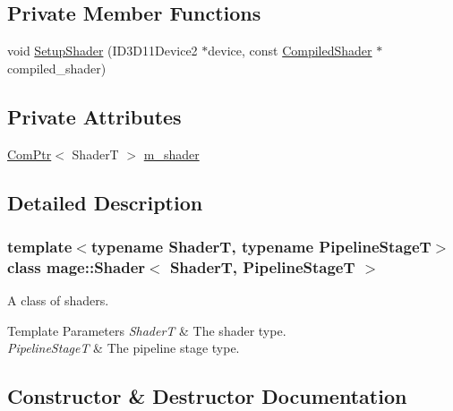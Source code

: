\subsection*{Private Member Functions}
\begin{DoxyCompactItemize}
\item 
void \hyperlink{classmage_1_1_shader_ac905389877d7722cc47b5f5177cf678f}{Setup\+Shader} (I\+D3\+D11\+Device2 $\ast$device, const \hyperlink{structmage_1_1_compiled_shader}{Compiled\+Shader} $\ast$compiled\+\_\+shader)
\end{DoxyCompactItemize}
\subsection*{Private Attributes}
\begin{DoxyCompactItemize}
\item 
\hyperlink{namespacemage_ae74f374780900893caa5555d1031fd79}{Com\+Ptr}$<$ ShaderT $>$ \hyperlink{classmage_1_1_shader_ac63260bdb25648451ddc1ee09d67c061}{m\+\_\+shader}
\end{DoxyCompactItemize}


\subsection{Detailed Description}
\subsubsection*{template$<$typename ShaderT, typename Pipeline\+StageT$>$\newline
class mage\+::\+Shader$<$ Shader\+T, Pipeline\+Stage\+T $>$}

A class of shaders.


\begin{DoxyTemplParams}{Template Parameters}
{\em ShaderT} & The shader type. \\
\hline
{\em Pipeline\+StageT} & The pipeline stage type. \\
\hline
\end{DoxyTemplParams}


\subsection{Constructor \& Destructor Documentation}
\hypertarget{classmage_1_1_shader_a4f02b0d895bd5aafbc72835f0f005c67}{}\label{classmage_1_1_shader_a4f02b0d895bd5aafbc72835f0f005c67} 
